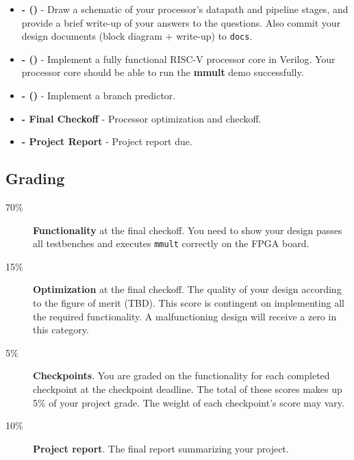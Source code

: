 \begin{minipage}{\textwidth}
\vspace{2mm}
\begin{itemize}
\item \textbf{\blockDiagramDueDate \space - \blockDiagramTaskName \space (\blockDiagramTimeAlloted)} -
  Draw a schematic of your processor's datapath and pipeline stages,
  and provide a brief write-up of your answers to the questions.
  Also commit your design documents (block diagram + write-up) to \verb|docs|.

\item \textbf{\baseCPUDueDate \space - \baseCPUTaskName \space (\baseCPUTimeAlloted)} -
  Implement a fully functional RISC-V processor core in Verilog.
  Your processor core should be able to run the \textbf{mmult} demo successfully.

\item \textbf{\branchPredictorDueDate \space - \branchPredictorTaskName \space (\branchPredictorTimeAlloted)} -
  Implement a branch predictor.
  
\item \textbf{\finalCheckoffDueDate \space - Final Checkoff} -
  Processor optimization and checkoff.
    
\item \textbf{\finalReportDueDate \space - Project Report} -
  Project report due.
\end{itemize}
\vspace{2mm}
\end{minipage}


\clearpage
\subsection{Grading}
\begin{framed}
\begin{description}
\item[70\%] {\bf Functionality} at the final checkoff.
  You need to show your design passes all testbenches
  and executes \verb|mmult| correctly on the FPGA board.
\item[15\%] {\bf Optimization} at the final checkoff.
  The quality of your design according to the figure of merit (TBD).
  This score is contingent on implementing all the required functionality.
  A malfunctioning design will receive a zero in this category.
\item[5\%] {\bf Checkpoints}.
  You are graded on the functionality for each completed checkpoint at the checkpoint deadline.
  The total of these scores makes up 5\% of your project grade.
  The weight of each checkpoint's score may vary.
\item[10\%] {\bf Project report}.
  The final report summarizing your project.
\end{description}
\end{framed}


